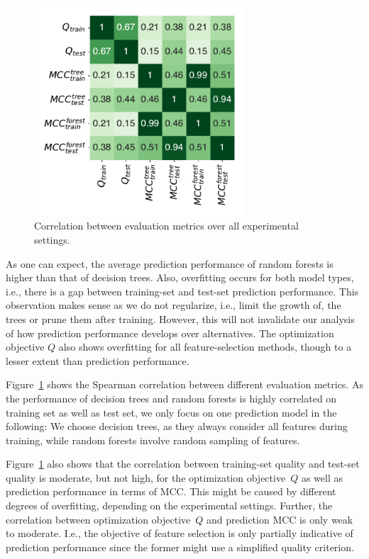 \documentclass{article}
\theoremstyle{definition}
\begin{document}
\begin{figure}[htb]
	\centering
	\includegraphics[width=0.7\textwidth, trim=15 15 15 15, clip]{plots/evaluation-metrics-correlation.pdf}
	\caption{Correlation between evaluation metrics over all experimental settings.}
	\label{fig:evaluation-metrics-correlation}
\end{figure}

As one can expect, the average prediction performance of random forests is higher than that of decision trees.
Also, overfitting occurs for both model types, i.e., there is a gap between training-set and test-set prediction performance.
This observation makes sense as we do not regularize, i.e., limit the growth of, the trees or prune them after training.
However, this will not invalidate our analysis of how prediction performance develops over alternatives.
The optimization objective $Q$ also shows overfitting for all feature-selection methods, though to a lesser extent than prediction performance.

Figure~\ref{fig:evaluation-metrics-correlation} shows the Spearman correlation between different evaluation metrics.
As the performance of decision trees and random forests is highly correlated on training set as well as test set, we only focus on one prediction model in the following:
We choose decision trees, as they always consider all features during training, while random forests involve random sampling of features.

Figure~\ref{fig:evaluation-metrics-correlation} also shows that the correlation between training-set quality and test-set quality is moderate, but not high, for the optimization objective~$Q$ as well as prediction performance in terms of MCC.
This might be caused by different degrees of overfitting, depending on the experimental settings.
Further, the correlation between optimization objective~$Q$ and prediction MCC is only weak to moderate.
I.e., the objective of feature selection is only partially indicative of prediction performance since the former might use a simplified quality criterion.
\end{document}
